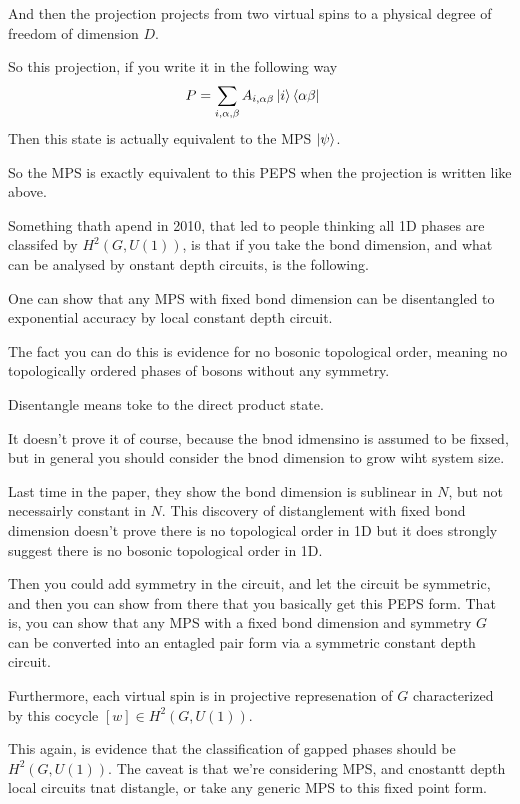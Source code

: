 And then the projection projects from two virtual spins to a physical degree of
freedom of dimension $D$.

So this projection,
if you write it in the following way
\begin{align}
    P &= \sum_{i,\alpha,\beta} A_{i,\alpha\beta} \ket{i}\bra{\alpha\beta}
\end{align}
Then this state is actually equivalent to the MPS $\ket{\psi}$.

So the MPS is exactly equivalent to this PEPS when the projection is written
like above.

Something thath apend in 2010,
that led to people thinking all 1D phases are classifed by $H^2(G, U(1))$,
is that if you take the bond dimension,
and what can be analysed by onstant depth circuits,
is the following.

One can show that any MPS with fixed bond dimension can be disentangled
to exponential accuracy by local constant depth circuit.

The fact you can do this is evidence for no bosonic topological order,
meaning no topologically ordered phases of bosons without any symmetry.

Disentangle means toke to the direct product state.

It doesn't prove it of course,
because the bnod idmensino is assumed to be fixsed,
but in general you should consider the bnod dimension to grow wiht system size.

Last time in the paper,
they show the bond dimension is sublinear in $N$,
but not necessairly constant in $N$.
This discovery of distanglement with fixed bond dimension doesn't prove there is
no topological order in 1D but it does strongly suggest there is no bosonic
topological order in 1D.

Then you could add symmetry in the circuit,
and let the circuit be symmetric,
and then you can show from there that you basically get this PEPS form.
That is,
you can show that any MPS with a fixed bond dimension and symmetry $G$
can be converted into an entagled pair form via a symmetric constant depth
circuit.

Furthermore, each virtual spin is in projective represenation of $G$
characterized by this cocycle
$[w] \in H^2(G,U(1))$.

This again,
is evidence that the classification of gapped phases should be
$H^2(G,U(1))$.
The caveat is that we're considering MPS,
and cnostantt depth local circuits tnat distangle,
or take any generic MPS to this fixed point form.

